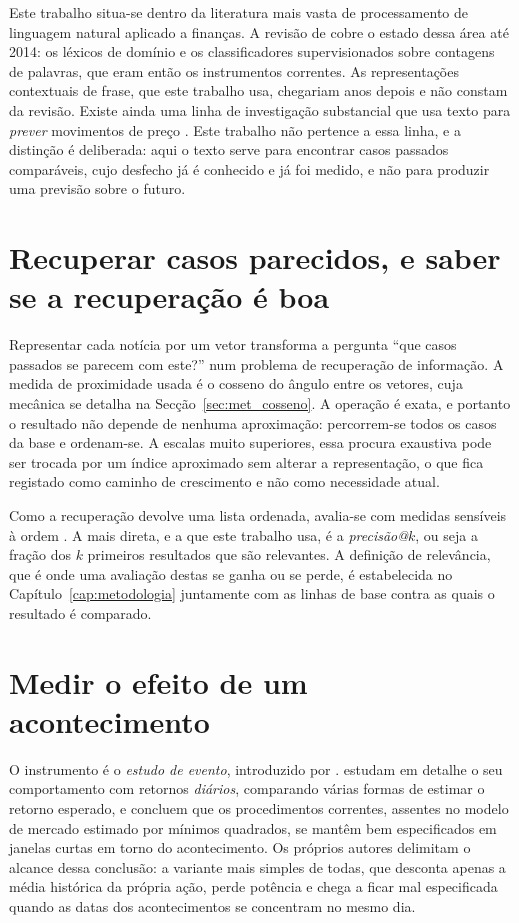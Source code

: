 Este trabalho situa-se dentro da literatura mais vasta de processamento de linguagem natural
aplicado a finanças. A revisão de \textcite{kearney2014textual} cobre o estado dessa área até 2014:
os léxicos de domínio e os classificadores supervisionados sobre contagens de palavras, que eram
então os instrumentos correntes. As representações contextuais de frase, que este trabalho usa,
chegariam anos depois e não constam da revisão. Existe ainda uma linha de investigação substancial que usa texto para \emph{prever}
movimentos de preço \autocite{xing2018nlffsurvey, ding2015deep}. Este trabalho não pertence a essa
linha, e a distinção é deliberada: aqui o texto serve para encontrar casos passados comparáveis,
cujo desfecho já é conhecido e já foi medido, e não para produzir uma previsão sobre o futuro.

\section{Recuperar casos parecidos, e saber se a recuperação é boa}
\label{sec:ctx_recuperacao}

Representar cada notícia por um vetor transforma a pergunta ``que casos passados se parecem com
este?'' num problema de recuperação de informação. A medida de proximidade usada é o cosseno do
ângulo entre os vetores, cuja mecânica se detalha na Secção~\ref{sec:met_cosseno}. A operação é
exata, e portanto o resultado não depende de nenhuma aproximação: percorrem-se todos os casos da
base e ordenam-se. A escalas muito superiores, essa procura exaustiva pode ser trocada por um índice
aproximado \autocite{johnson2021faiss} sem alterar a representação, o que fica registado como
caminho de crescimento e não como necessidade atual.

Como a recuperação devolve uma lista ordenada, avalia-se com medidas sensíveis à ordem
\autocite{manning2008ir}. A mais direta, e a que este trabalho usa, é a \emph{precisão@$k$}, ou seja
a fração dos $k$ primeiros resultados que são relevantes. A definição de relevância, que é onde uma
avaliação destas se ganha ou se perde, é estabelecida no Capítulo~\ref{cap:metodologia} juntamente com as
linhas de base contra as quais o resultado é comparado.

\section{Medir o efeito de um acontecimento}
\label{sec:ctx_evento}

O instrumento é o \emph{estudo de evento}, introduzido por \textcite{fama1969adjustment}.
\textcite{brown1985daily} estudam em detalhe o seu comportamento com retornos \emph{diários},
comparando várias formas de estimar o retorno esperado, e concluem que os procedimentos correntes,
assentes no modelo de mercado estimado por mínimos quadrados, se mantêm bem especificados em janelas
curtas em torno do acontecimento. Os próprios autores delimitam o alcance dessa conclusão: a variante
mais simples de todas, que desconta apenas a média histórica da própria ação, perde potência e
chega a ficar mal especificada quando as datas dos acontecimentos se concentram no mesmo dia.

